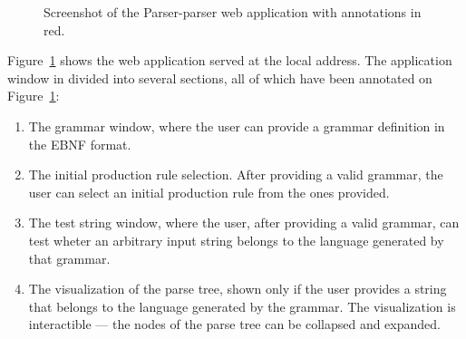 \documentclass[english,bachelors,forcepolishlogotype]{wizthesis}
\newcommand{\thisproject}{Parser-parser}
\begin{document}
\begin{figure}[ht]
  \centering
  \caption{Screenshot of the \thisproject{} web application with annotations in
  red.}
  \label{fig:parser-parser-screenshot}
\end{figure}

Figure~\ref{fig:parser-parser-screenshot} shows the web application served at
the local address. The application window in divided into several sections,
all of which have been annotated on Figure~\ref{fig:parser-parser-screenshot}:
\begin{enumerate}
  \item The grammar window, where the user can provide a grammar definition
  in the EBNF format.
  \item The initial production rule selection. After providing a valid grammar,
  the user can select an initial production rule from the ones provided.
  \item The test string window, where the user, after providing a valid grammar,
  can test wheter an arbitrary input string belongs to the language generated
  by that grammar.
  \item The visualization of the parse tree, shown only if the user provides a
  string that belongs to the language generated by the grammar. The
  visualization is interactible --- the nodes of the parse tree can be collapsed
  and expanded.
\end{enumerate}
\end{document}
